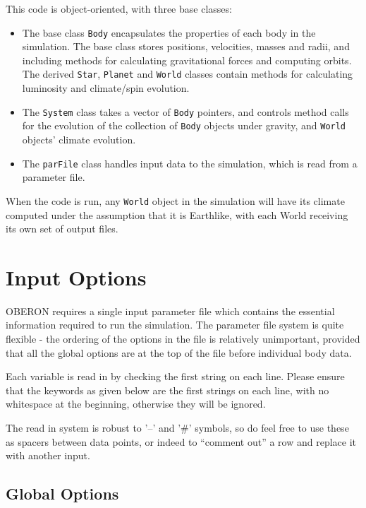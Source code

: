 \documentclass[usenatbib,11pt]{article}
\begin{document}
This code is object-oriented, with three base classes:

\begin{itemize}

\item The base class \texttt{Body} encapsulates the properties of each body in the simulation.  The base class stores positions, velocities, masses and radii, and including methods for calculating gravitational forces and computing orbits.  The derived \texttt{Star}, \texttt{Planet} and \texttt{World} classes contain methods for calculating luminosity and climate/spin evolution.

\item The \texttt{System} class takes a vector of \texttt{Body} pointers, and controls method calls for the evolution of the collection of \texttt{Body} objects under gravity, and \texttt{World} objects' climate evolution.

\item The \texttt{parFile} class handles input data to the simulation, which is read from a parameter file.

\end{itemize}

When the code is run, any \texttt{World} object in the simulation will have its climate computed under the assumption that it is Earthlike, with each World receiving its own set of output files.

\section{Input Options}

\noindent OBERON requires a single input parameter file which contains the essential information required to run the simulation.  The parameter file system is quite flexible - the ordering of the options in the file is relatively unimportant, provided that all the global options are at the top of the file before individual body data.

Each variable is read in by checking the first string on each line.  Please ensure that the keywords as given below are the first strings on each line, with no whitespace at the beginning, otherwise they will be ignored.  

The read in system is robust to '--' and '\#' symbols, so do feel free to use these as spacers between data points, or indeed to ``comment out'' a row and replace it with another input. 

\subsection{Global Options}
\end{document}
